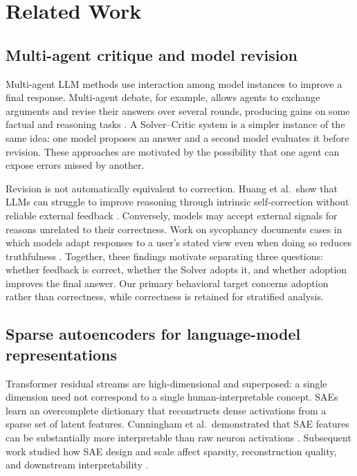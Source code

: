 \section{Related Work}
\label{sec:related-work}

\subsection{Multi-agent critique and model revision}

Multi-agent LLM methods use interaction among model instances to improve a
final response. Multi-agent debate, for example, allows agents to exchange
arguments and revise their answers over several rounds, producing gains on
some factual and reasoning tasks \cite{du2024debate}. A Solver--Critic system
is a simpler instance of the same idea: one model proposes an answer and a
second model evaluates it before revision. These approaches are motivated by
the possibility that one agent can expose errors missed by another.

Revision is not automatically equivalent to correction. Huang et
al.\ show that LLMs can struggle to improve reasoning through intrinsic
self-correction without reliable external feedback
\cite{huang2024selfcorrect}. Conversely, models may accept external signals
for reasons unrelated to their correctness. Work on sycophancy documents cases
in which models adapt responses to a user's stated view even when doing so
reduces truthfulness \cite{sharma2024sycophancy}. Together, these findings
motivate separating three questions: whether feedback is correct, whether the
Solver adopts it, and whether adoption improves the final answer. Our primary
behavioral target concerns adoption rather than correctness, while correctness
is retained for stratified analysis.

\subsection{Sparse autoencoders for language-model representations}

Transformer residual streams are high-dimensional and superposed: a single
dimension need not correspond to a single human-interpretable concept. SAEs
learn an overcomplete dictionary that reconstructs dense activations from a
sparse set of latent features. Cunningham et al.\ demonstrated that SAE
features can be substantially more interpretable than raw neuron activations
\cite{cunningham2023sparse}. Subsequent work studied how SAE design and scale
affect sparsity, reconstruction quality, and downstream interpretability
\cite{gao2025scaling}.


